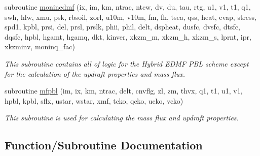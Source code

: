 \begin{DoxyCompactItemize}
\item 
subroutine \hyperlink{group___h_e_d_m_f_ga367b6dabfff601023af323f900db86d2}{moninedmf} (ix, im, km, ntrac, ntcw, dv, du, tau, rtg, u1, v1, t1, q1, swh, hlw, xmu, psk, rbsoil, zorl, u10m, v10m, fm, fh, tsea, qss, heat, evap, stress, spd1, kpbl, prsi, del, prsl, prslk, phii, phil, delt, dspheat, dusfc, dvsfc, dtsfc, dqsfc, hpbl, hgamt, hgamq, dkt, kinver, xkzm\+\_\+m, xkzm\+\_\+h, xkzm\+\_\+s, lprnt, ipr, xkzminv, moninq\+\_\+fac)
\begin{DoxyCompactList}\small\item\em This subroutine contains all of logic for the Hybrid E\+D\+MF P\+BL scheme except for the calculation of the updraft properties and mass flux. \end{DoxyCompactList}\end{DoxyCompactItemize}
\begin{DoxyCompactItemize}
\item 
subroutine \hyperlink{group___h_e_d_m_f_ga5787e718b62c0502c0734303a16cd8ed}{mfpbl} (im, ix, km, ntrac, delt, cnvflg, zl, zm, thvx, q1, t1, u1, v1, hpbl, kpbl, sflx, ustar, wstar, xmf, tcko, qcko, ucko, vcko)
\begin{DoxyCompactList}\small\item\em This subroutine is used for calculating the mass flux and updraft properties. \end{DoxyCompactList}\end{DoxyCompactItemize}


\subsection{Function/\+Subroutine Documentation}
\mbox{\label{group___h_e_d_m_f_ga5787e718b62c0502c0734303a16cd8ed}} 
